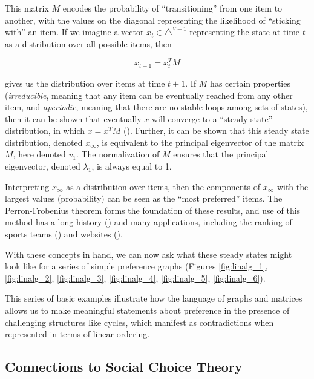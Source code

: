 This matrix $M$ encodes the probability of ``transitioning'' from one item to another, with the values on the diagonal representing the likelihood of ``sticking with'' an item. 
If we imagine a vector $x_t \in \triangle^{V-1}$ representing the state at time $t$ as a distribution over all possible items, then

\[
x_{t+1} = x_t^TM
\]

gives us the distribution over items at time $t+1$.
If $M$ has certain properties (\textit{irreducible}, meaning that any item can be eventually reached from any other item, and \textit{aperiodic}, meaning that there are no stable loops among sets of states), then it can be shown that eventually $x$ will converge to a ``steady state'' distribution, in which $x = x^TM$ (\cite{lin:2016}).
Further, it can be shown that this steady state distribution, denoted $x_{\infty}$, is equivalent to the principal eigenvector of the matrix $M$, here denoted $v_1$.
The normalization of $M$ ensures that the principal eigenvector, denoted $\lambda_1$, is always equal to 1.

Interpreting $x_{\infty}$ as a distribution over items, then the components of $x_{\infty}$ with the largest values (probability) can be seen as the ``most preferred'' items.
The Perron-Frobenius theorem forms the foundation of these results, and use of this method has a long history (\cite{keener:1993}) and many applications, including the ranking of sports teams (\cite{landau:1915}) and websites (\cite{brin}).

\bigskip

With these concepts in hand, we can now ask what these steady states might look like for a series of simple preference graphs (Figures \ref{fig:linalg_1}, \ref{fig:linalg_2}, \ref{fig:linalg_3}, \ref{fig:linalg_4}, \ref{fig:linalg_5}, \ref{fig:linalg_6}).





This series of basic examples illustrate how the language of graphs and matrices allows us to make meaningful statements about preference in the presence of challenging structures like cycles, which manifest as contradictions when represented in terms of linear ordering.

\FloatBarrier

\subsection{Connections to Social Choice Theory}

